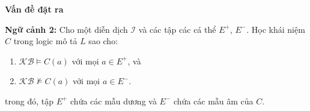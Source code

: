 \documentclass[notheorems,xcolor=dvipsnames]{beamer}
\newcommand{\mI}		{\mathcal{I}}
\newcommand{\KB}		{\mathcal{KB}}
\begin{document}
\begin{frame}{\bf Vấn đề đặt ra}
	\begin{block}{}
		{\bf Ngữ cảnh 2:} Cho một diễn dịch $\mI$ và các tập các cá thể $E^+$, $E^-$. Học khái niệm $C$ trong logic mô tả $L$ sao cho:
		\begin{enumerate}
			\setlength{\itemsep}{1.0ex}
			\item $\KB \models C(a)$ với mọi $a \in E^+$, và
			\item $\KB \not\models C(a)$ với mọi $a \in E^-$.
		\end{enumerate}
		trong đó, tập $E^+$ chứa các mẫu dương và $E^-$ chứa các mẫu âm của $C$.
	\end{block}
\end{frame}

\end{document}
